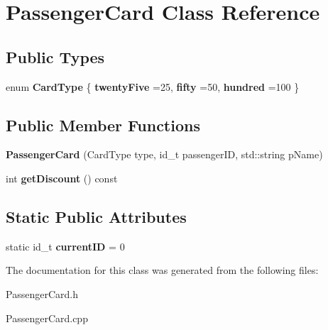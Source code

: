 \hypertarget{classPassengerCard}{}\section{Passenger\+Card Class Reference}
\label{classPassengerCard}
\subsection*{Public Types}
\begin{DoxyCompactItemize}
\item 
\mbox{\label{classPassengerCard_ac30388c823af514403463a797e2878af}} 
enum {\bfseries Card\+Type} \{ {\bfseries twenty\+Five} =25, 
{\bfseries fifty} =50, 
{\bfseries hundred} =100
 \}
\end{DoxyCompactItemize}
\subsection*{Public Member Functions}
\begin{DoxyCompactItemize}
\item 
\mbox{\label{classPassengerCard_a1ebc730da7c0820350024f29c37ce9d9}} 
{\bfseries Passenger\+Card} (Card\+Type type, id\+\_\+t passenger\+ID, std\+::string p\+Name)
\item 
\mbox{\label{classPassengerCard_a62d2651d233d28643d5e0863500c42c4}} 
int {\bfseries get\+Discount} () const
\end{DoxyCompactItemize}
\subsection*{Static Public Attributes}
\begin{DoxyCompactItemize}
\item 
\mbox{\label{classPassengerCard_af557a01fde14b95c0e0b355e777e2aec}} 
static id\+\_\+t {\bfseries current\+ID} = 0
\end{DoxyCompactItemize}


The documentation for this class was generated from the following files\+:\begin{DoxyCompactItemize}
\item 
Passenger\+Card.\+h\item 
Passenger\+Card.\+cpp\end{DoxyCompactItemize}
